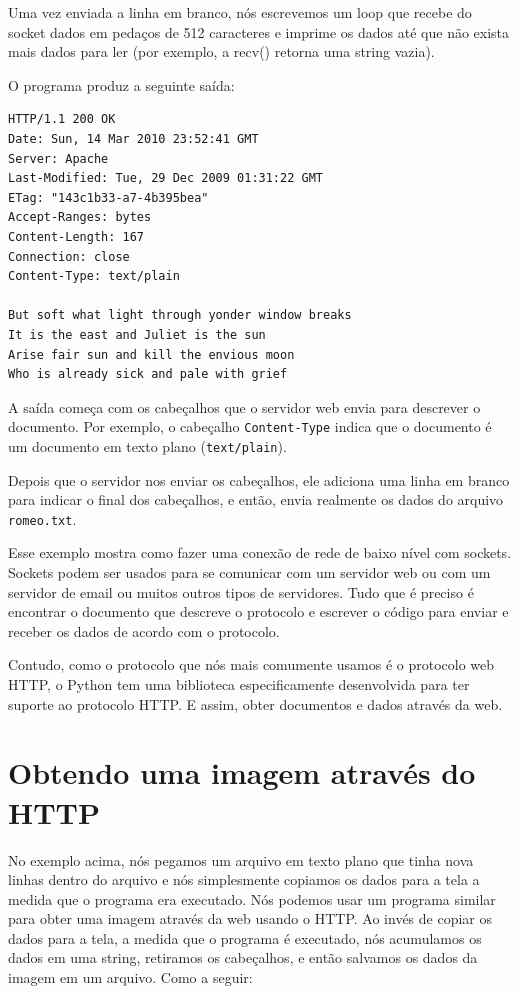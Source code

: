 Uma vez enviada a linha em branco, nós escrevemos um loop que recebe do
socket dados em pedaços de 512 caracteres e imprime os dados até que não
exista mais dados para ler (por exemplo, a recv() retorna uma string vazia).

O programa produz a seguinte saída:

\beforeverb
\begin{verbatim}
HTTP/1.1 200 OK
Date: Sun, 14 Mar 2010 23:52:41 GMT
Server: Apache
Last-Modified: Tue, 29 Dec 2009 01:31:22 GMT
ETag: "143c1b33-a7-4b395bea"
Accept-Ranges: bytes
Content-Length: 167
Connection: close
Content-Type: text/plain

But soft what light through yonder window breaks
It is the east and Juliet is the sun
Arise fair sun and kill the envious moon
Who is already sick and pale with grief
\end{verbatim}
\afterverb
%
A saída começa com os cabeçalhos que o servidor web envia
para descrever o documento.
Por exemplo, o cabeçalho {\tt Content-Type} indica que
o documento é um documento em texto plano ({\tt text/plain}).

Depois que o servidor nos enviar os cabeçalhos, ele adiciona uma
linha em branco para indicar o final dos cabeçalhos, e então, envia
realmente os dados do arquivo {\tt romeo.txt}.

Esse exemplo mostra como fazer uma conexão de rede de baixo nível
com sockets.   Sockets podem ser usados para se comunicar com um
servidor web ou com um servidor de email ou muitos outros tipos
de servidores. Tudo que é preciso é encontrar o documento que
descreve o protocolo e escrever o código para enviar e receber os 
dados de acordo com o protocolo.

Contudo, como o protocolo que nós mais comumente usamos é
o protocolo web HTTP, o Python tem uma biblioteca especificamente
desenvolvida para ter suporte ao protocolo HTTP. E assim, obter 
documentos e dados através da web.

\section{Obtendo uma imagem através do HTTP}

No exemplo acima, nós pegamos um arquivo em texto plano 
que tinha nova linhas dentro do arquivo e nós simplesmente
copiamos os dados para a tela a medida que o programa era
executado.   Nós podemos usar um programa similar para
obter uma imagem através da web usando o HTTP.   Ao invés de
copiar os dados para a tela, a medida que o programa é
executado, nós acumulamos os dados em uma string, retiramos
os cabeçalhos, e então salvamos os dados da imagem em um
arquivo. Como a seguir:

